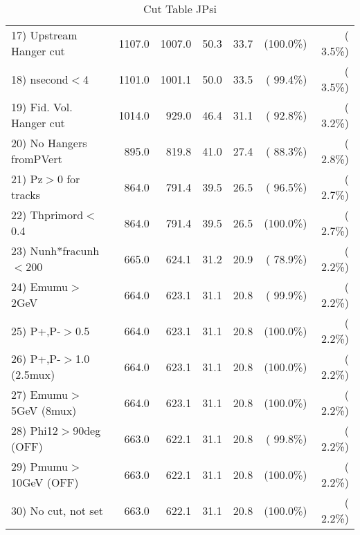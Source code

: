 \begin{table}[h!]
\begin{tabular}{||l||r|r|r|r|r|r||}
 17) Upstream Hanger cut  &       1107.0 &       1007.0 &         50.3 &         33.7 & (100.0\%) & (  3.5\%) \\
 18) nsecond$<$4          &       1101.0 &       1001.1 &         50.0 &         33.5 & ( 99.4\%) & (  3.5\%) \\
 19) Fid. Vol. Hanger cut &       1014.0 &        929.0 &         46.4 &         31.1 & ( 92.8\%) & (  3.2\%) \\
 20) No Hangers fromPVert &        895.0 &        819.8 &         41.0 &         27.4 & ( 88.3\%) & (  2.8\%) \\
 21) Pz$>$0 for tracks    &        864.0 &        791.4 &         39.5 &         26.5 & ( 96.5\%) & (  2.7\%) \\
 22) Thprimord$<$0.4      &        864.0 &        791.4 &         39.5 &         26.5 & (100.0\%) & (  2.7\%) \\
 23) Nunh*fracunh$<$200   &        665.0 &        624.1 &         31.2 &         20.9 & ( 78.9\%) & (  2.2\%) \\
 24) Emumu$>$2GeV         &        664.0 &        623.1 &         31.1 &         20.8 & ( 99.9\%) & (  2.2\%) \\
 25) P+,P-$>$0.5          &        664.0 &        623.1 &         31.1 &         20.8 & (100.0\%) & (  2.2\%) \\
 26) P+,P-$>$1.0 (2.5mux) &        664.0 &        623.1 &         31.1 &         20.8 & (100.0\%) & (  2.2\%) \\
 27) Emumu$>$5GeV  (8mux) &        664.0 &        623.1 &         31.1 &         20.8 & (100.0\%) & (  2.2\%) \\
 28) Phi12$>$90deg  (OFF) &        663.0 &        622.1 &         31.1 &         20.8 & ( 99.8\%) & (  2.2\%) \\
 29) Pmumu$>$10GeV  (OFF) &        663.0 &        622.1 &         31.1 &         20.8 & (100.0\%) & (  2.2\%) \\
 30) No cut, not set      &        663.0 &        622.1 &         31.1 &         20.8 & (100.0\%) & (  2.2\%) \\
 \hline
 \hline
 \end{tabular}
 \caption{Cut Table  JPsi     }
 \label{tab-cutcohjpsi-mumu_cohrhop}
 \end{table}
